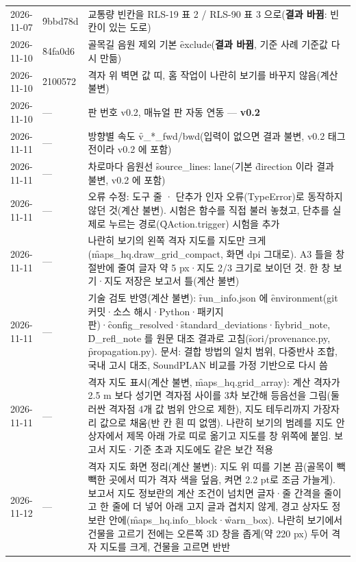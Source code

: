 \documentclass[10.5pt,a4paper]{article}
\begin{document}
\begin{longtable}{P{22mm}P{24mm}P{106mm}}
2026-11-07 & \f{9bbd78d} & 교통량 빈칸을 RLS-19 표 2 / RLS-90 표 3 으로(\textbf{결과 바뀜}: 빈칸이 있는 도로) \\
2026-11-10 & \f{84fa0d6} & 골목길 음원 제외 기본 \f{exclude}(\textbf{결과 바뀜}, 기준 사례 기준값 다시 만듦) \\
2026-11-10 & \f{2100572} & 격자 위 벽면 값 띠, 홈 작업이 나란히 보기를 바꾸지 않음(계산 불변) \\
2026-11-10 & — & 판 번호 v0.2, 매뉴얼 판 자동 연동 — \textbf{v0.2} \\
2026-11-11 & — & 방향별 속도 \f{v\_*\_fwd/bwd}(입력이 없으면 결과 불변, v0.2 태그 전이라 v0.2 에 포함) \\
2026-11-11 & — & 차로마다 음원선 \f{source\_lines: lane}(기본 \f{direction} 이라 결과 불변, v0.2 에 포함) \\
2026-11-11 & — & 오류 수정: 도구 줄 · 단추가 인자 오류(TypeError)로 동작하지 않던 것(계산 불변). 시험은 함수를 직접 불러 놓쳤고, 단추를 실제로 누르는 경로(\f{QAction.trigger}) 시험을 추가 \\
2026-11-11 & — & 나란히 보기의 왼쪽 격자 지도를 지도만 크게(\f{maps\_hq.draw\_grid\_compact}, 화면 dpi 그대로). A3 틀을 창 절반에 줄여 글자 약 5 px·지도 2/3 크기로 보이던 것. 한 창 보기·지도 저장은 보고서 틀(계산 불변) \\
2026-11-11 & — & 기술 검토 반영(계산 불변): \f{run\_info.json} 에 \f{environment}(git 커밋·소스 해시·Python·패키지 판)·\f{config\_resolved}·\f{standard\_deviations}·\f{hybrid\_note}, \f{D\_refl\_note} 를 원문 대조 결과로 고침(\f{sori/provenance.py}, \f{propagation.py}). 문서: 결합 방법의 일치 범위, 다중반사 조합, 국내 고시 대조, SoundPLAN 비교를 가정 기반으로 다시 씀 \\
2026-11-11 & — & 격자 지도 표시(계산 불변, \f{maps\_hq.grid\_array}): 계산 격자가 2.5 m 보다 성기면 격자점 사이를 3차 보간해 등음선을 그림(둘러싼 격자점 4개 값 범위 안으로 제한), 지도 테두리까지 가장자리 값으로 채움(반 칸 흰 띠 없앰). 나란히 보기의 범례를 지도 안 상자에서 제목 아래 가로 띠로 옮기고 지도를 창 위쪽에 붙임. 보고서 지도·기준 초과 지도에도 같은 보간 적용 \\
2026-11-12 & — & 격자 지도 화면 정리(계산 불변): 지도 위  띠를 기본 끔(골목이 빽빽한 곳에서 띠가 격자 색을 덮음, 켜면 2.2 pt로 조금 가늘게). 보고서 지도 정보란의 계산 조건이 넘치면 글자·줄 간격을 줄이고 한 줄에 더 넣어 아래 고지 글과 겹치지 않게, 경고 상자도 정보란 안에(\f{maps\_hq.info\_block}·\f{warn\_box}). 나란히 보기에서 건물을 고르기 전에는 오른쪽 3D 창을 좁게(약 220 px) 두어 격자 지도를 크게, 건물을 고르면 반반 \\

\end{longtable}
\end{document}
